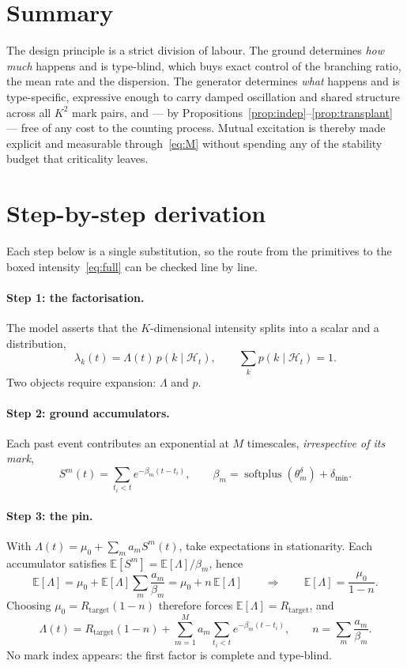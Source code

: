 \documentclass[11pt]{article}
\theoremstyle{remark}
\newcommand{\Hist}{\mathcal{H}}
\newcommand{\E}{\mathbb{E}}
\newcommand{\Rtar}{R_{\mathrm{target}}}
\newcommand{\softplus}{\operatorname{softplus}}
\begin{document}
\section{Summary}

The design principle is a strict division of labour. The ground determines
\emph{how much} happens and is type-blind, which buys exact control of the
branching ratio, the mean rate and the dispersion. The generator determines
\emph{what} happens and is type-specific, expressive enough to carry damped
oscillation and shared structure across all $K^2$ mark pairs, and --- by
Propositions~\ref{prop:indep}--\ref{prop:transplant} --- free of any cost to the
counting process. Mutual excitation is thereby made explicit and measurable
through~\eqref{eq:M} without spending any of the stability budget that
criticality leaves.

\appendix
\section{Step-by-step derivation}
\label{app:derivation}

Each step below is a single substitution, so the route from the primitives to
the boxed intensity~\eqref{eq:full} can be checked line by line.

\paragraph{Step 1: the factorisation.}
The model asserts that the $K$-dimensional intensity splits into a scalar and a
distribution,
\[
\lambda_k(t)=\Lambda(t)\,p(k\mid\Hist_t),
\qquad
\sum_{k}p(k\mid\Hist_t)=1 .
\]
Two objects require expansion: $\Lambda$ and $p$.

\paragraph{Step 2: ground accumulators.}
Each past event contributes an exponential at $M$ timescales, \emph{irrespective
of its mark},
\[
S^m(t)=\sum_{t_i<t}e^{-\beta_m(t-t_i)},
\qquad
\beta_m=\softplus(\theta^\delta_m)+\delta_{\min}.
\]

\paragraph{Step 3: the pin.}
With $\Lambda(t)=\mu_0+\sum_m a_m S^m(t)$, take expectations in stationarity.
Each accumulator satisfies $\E[S^m]=\E[\Lambda]/\beta_m$, hence
\[
\E[\Lambda]=\mu_0+\E[\Lambda]\sum_m\frac{a_m}{\beta_m}=\mu_0+n\,\E[\Lambda]
\qquad\Longrightarrow\qquad
\E[\Lambda]=\frac{\mu_0}{1-n}.
\]
Choosing $\mu_0=\Rtar(1-n)$ therefore forces $\E[\Lambda]=\Rtar$, and
\[
\Lambda(t)=\Rtar(1-n)+\sum_{m=1}^{M}a_m\sum_{t_i<t}e^{-\beta_m(t-t_i)},
\qquad n=\sum_m\frac{a_m}{\beta_m}.
\]
No mark index appears: the first factor is complete and type-blind.
\end{document}
